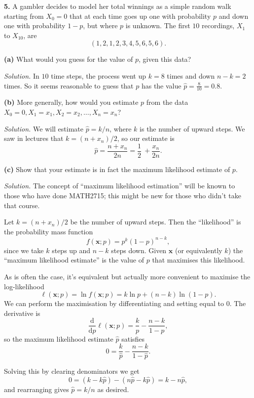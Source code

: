 \documentclass[
  a4paper,
]{article}
\theoremstyle{definition}
\theoremstyle{definition}
\theoremstyle{definition}
\theoremstyle{remark}
\begin{document}
\textbf{5.} A gambler decides to model her total winnings as a simple random walk starting from \(X_0 = 0\) that at each time goes up one with probability \(p\) and down one with probability \(1-p\), but where \(p\) is unknown. The first \(10\) recordings, \(X_1\) to \(X_{10}\), are
\[ (1, 2, 1, 2, 3, 4, 5, 6, 5, 6) . \]

\textbf{(a)} What would you guess for the value of \(p\), given this data?

\begin{myanswers}

\emph{Solution.} In \(10\) time steps, the process went up \(k = 8\) times and down \(n - k = 2\) times. So it seems reasonable to guess that \(p\) has the value \(\hat p = \frac{8}{10} = 0.8\).

\end{myanswers}

\textbf{(b)} More generally, how would you estimate \(p\) from the data \(X_0 = 0, X_1 = x_1, X_2 = x_2, \dots, X_n = x_n\)?

\begin{myanswers}

\emph{Solution.} We will estimate \(\hat p = k/n\), where \(k\) is the number of upward steps. We saw in lectures that \(k = (n + x_n)/2\), so our estimate is
\[ \hat p = \frac{n + x_n}{2n} = \frac12\ + \frac{x_n}{2n} . \]

\end{myanswers}

\textbf{(c)} Show that your estimate is in fact the maximum likelihood estimate of \(p\).

\begin{myanswers}

\emph{Solution.} The concept of ``maximum likelihood estimation'' will be known to those who have done MATH2715; this might be new for those who didn't take that course.

Let \(k = (n + x_n)/2\) be the number of upward steps. Then the ``likelihood'' is the probability mass function
\[ f(\mathbf x; p) = p^{k}(1-p)^{n-k} , \]
since we take \(k\) steps up and \(n-k\) steps down.
Given \(\mathbf x\) (or equivalently \(k\)) the ``maximum likelihood estimate'' is the value of \(p\) that maximises this likelihood.

As is often the case, it's equivalent but actually more convenient to maximise the log-likelihood
\[ \ell(\mathbf x; p) = \ln f(\mathbf x; p) = k \ln p + (n-k)\ln(1-p) .\]
We can perform the maximisation by differentiating and setting equal to \(0\). The derivative is
\[ \frac{\text{d}}{\text{d}p} \ell(\mathbf x; p) = \frac kp - \frac{n-k}{1-p} ,\]
so the maximum likelihood estimate \(\hat p\) satisfies
\[ 0 = \frac k{\hat p} - \frac{n-k}{1-\hat p} . \]

Solving this by clearing denominators we get
\[ 0 = (k - k\hat p) - (n\hat p - k\hat p) = k - n \hat p , \]
and rearranging gives \(\hat p = k/n\) as desired.

\end{myanswers}
\end{document}
